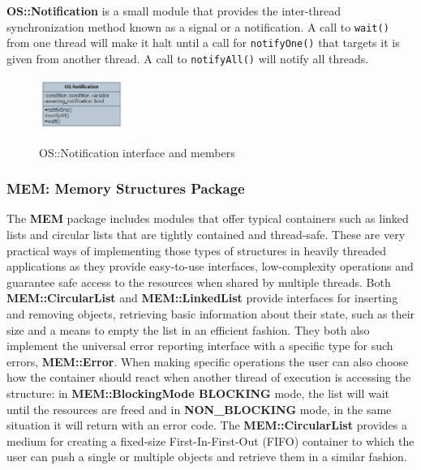 \textbf{OS::Notification} is a small module that provides the inter-thread synchronization method known as a signal or a notification. A call to \texttt{wait()} from one thread will make it halt until a call for \texttt{notifyOne()} that targets it is given from another thread. A call to \texttt{notifyAll()} will notify all threads. 


\begin{figure}[H]
	\centering
	\includegraphics[width=0.28\textwidth]{./img/navig-class-notification.png}
	\caption {OS::Notification interface and members}
	\label{fig:navig-class-notification}
	\end{figure}


\subsubsection{MEM: Memory Structures Package}

The \textbf{MEM} package includes modules that offer typical containers such as linked lists and circular lists that are tightly contained and thread-safe. These are very practical ways of implementing those types of structures in heavily threaded applications as they provide easy-to-use interfaces, low-complexity operations and guarantee safe access to the resources when shared by multiple threads. 
\newline
Both \textbf{MEM::CircularList} and \textbf{MEM::LinkedList} provide interfaces for inserting and removing objects, retrieving basic information about their state, such as their size and a means to empty the list in an efficient fashion. They both also implement the universal error reporting interface with a specific type for such errors, \textbf{MEM::Error}. When making specific operations the user can also choose how the container should react when another thread of execution is accessing the structure: in \textbf{MEM::BlockingMode BLOCKING} mode, the list will wait until the resources are freed and in \textbf{NON\_BLOCKING} mode, in the same situation it will return with an error code.
\newline
The \textbf{MEM::CircularList} provides a medium for creating a fixed-size First-In-First-Out (FIFO) container to which the user can push a single or multiple objects and retrieve them in a similar fashion. 

